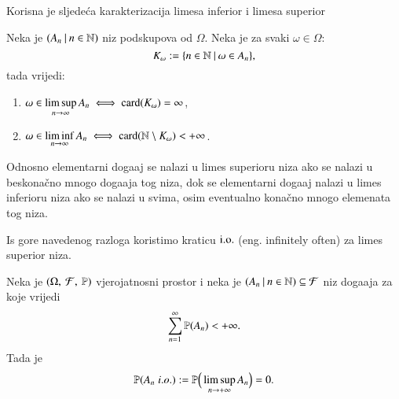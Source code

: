 Korisna je sljede\' ca karakterizacija limesa inferior i limesa superior

\begin{prop}    \label{prop:9.1-2}
    Neka je $({A_n} \: | \: {n \in \mathbb{N}})$ niz podskupova od $\Omega$.
    Neka je za svaki $\omega \in \Omega$:
    \begin{equation*}
        K_\omega := \{{n \in \mathbb{N}} \: | \: {\omega \in A_n}\},
    \end{equation*}
    tada vrijedi:
    \begin{enumerate}[label=(\arabic*)]
        \item $\omega \in \limsup\limits_{n \to \infty} A_n \iff \mathrm{card}({K_\omega}) = \infty$,
        \item $\omega \in \liminf\limits_{n \to \infty} A_n \iff \mathrm{card}({\mathbb{N} \setminus K_\omega}) < +\infty$.
    \end{enumerate}
\end{prop}

Odnosno elementarni doga\dj aj se nalazi u limes superioru niza ako se nalazi u beskona\v cno mnogo doga\dj aja tog niza, dok se elementarni doga\dj aj nalazi u limes inferioru niza ako se nalazi u svima, osim eventualno kona\v cno mnogo elemenata tog niza.

\begin{nap} \label{nap:9.1-3}
    Is gore navedenog razloga koristimo kraticu $\mathrm{i.o.}$ (eng. infinitely often) za limes superior niza.    
\end{nap}

\begin{lm}  \label{lm:9.2}
    Neka je $(\Omega, \: \mathcal{F}, \: \mathbb{P})$ vjerojatnosni prostor i neka je $({A_n} \: | \: {n \in \mathbb{N}}) \subseteq \mathcal{F}$ niz doga\dj aja za koje vrijedi
    \begin{equation*}
        \sum\limits_{n = 1}^{\infty} \mathbb{P}({A_n}) < +\infty.
    \end{equation*}
    Tada je
    \begin{equation*}
        \mathbb{P}({A_n \; i.o.}) := \mathbb{P} \Big( \limsup\limits_{n \to +\infty} A_n \Big) = 0.
    \end{equation*}
\end{lm}

